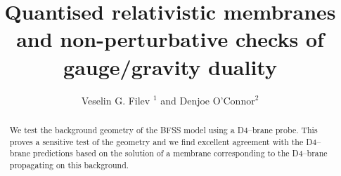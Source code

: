 \documentclass[a4paper]{jpconf}
\begin{document}
\title{Quantised relativistic membranes and non-perturbative checks of
gauge/gravity duality}

\author{Veselin G. Filev ${}^1$ and Denjoe O'Connor${}^2$}
\address{${}^1$  Institute of Mathematics and Informatics,\\
Bulgarian Academy of Sciences, Acad. G. Bonchev Str., 1113 Sofia, Bulgaria}
\address{${}^2$ School of Theoretical Physics,
  Dublin Institute for Advanced Studies, \\
       10 Burlington Road, 
       Dublin 4, Ireland.
}



\begin{abstract}
  We test the background geometry of the BFSS model using a D4--brane
  probe. This proves a sensitive test of the geometry and we find
  excellent agreement with the D4--brane predictions based on
  the solution of a membrane corresponding to the D4--brane propagating on
  this background. 
\end{abstract}
\end{document}
